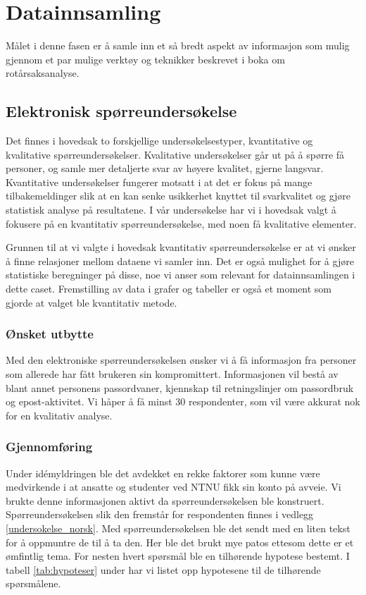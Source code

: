 \chapter{Datainnsamling}
Målet i denne fasen er å samle inn et så bredt aspekt av informasjon som mulig gjennom et par mulige verktøy og teknikker beskrevet i boka om rotårsaksanalyse\cite{RCA}.



\section{Elektronisk spørreundersøkelse}
Det finnes i hovedsak to forskjellige undersøkelsestyper, kvantitative og kvalitative spørreundersøkelser. Kvalitative undersøkelser går ut på å spørre få personer, og samle mer detaljerte svar av høyere kvalitet, gjerne langsvar. Kvantitative undersøkelser fungerer motsatt i at det er fokus på mange tilbakemeldinger slik at en kan senke usikkerhet knyttet til svarkvalitet og gjøre statistisk analyse på resultatene. I vår undersøkelse har vi i hovedsak valgt å fokusere på en kvantitativ spørreundersøkelse, med noen få kvalitative elementer. 

Grunnen til at vi valgte i hovedsak kvantitativ spørreundersøkelse er at vi ønsker å finne relasjoner mellom dataene vi samler inn. Det er også mulighet for å gjøre statistiske beregninger på disse, noe vi anser som relevant for datainnsamlingen i dette caset. Fremstilling av data i grafer og tabeller er også et moment som gjorde at valget ble kvantitativ metode. 

\subsection{Ønsket utbytte}
Med den elektroniske spørreundersøkelsen ønsker vi å få informasjon fra personer som allerede har fått brukeren sin kompromittert. Informasjonen vil bestå av blant annet personens passordvaner, kjennskap til retningslinjer om passordbruk og epost-aktivitet. Vi håper å få minst 30 respondenter, som vil være akkurat nok for en kvalitativ analyse. 

\subsection{Gjennomføring}
Under idémyldringen ble det avdekket en rekke faktorer som kunne være medvirkende i at ansatte og studenter ved NTNU fikk sin konto på avveie. Vi brukte denne informasjonen aktivt da spørreundersøkelsen ble konstruert. Spørreundersøkelsen slik den fremstår for respondenten finnes i vedlegg \ref{undersokelse_norsk}. Med spørreundersøkelsen ble det sendt med en liten tekst for å oppmuntre de til å ta den. Her ble det brukt mye patos ettesom dette er et ømfintlig tema. For nesten hvert spørsmål ble en tilhørende hypotese bestemt. I tabell \ref{tab:hypoteser} under har vi listet opp hypotesene til de tilhørende spørsmålene.


